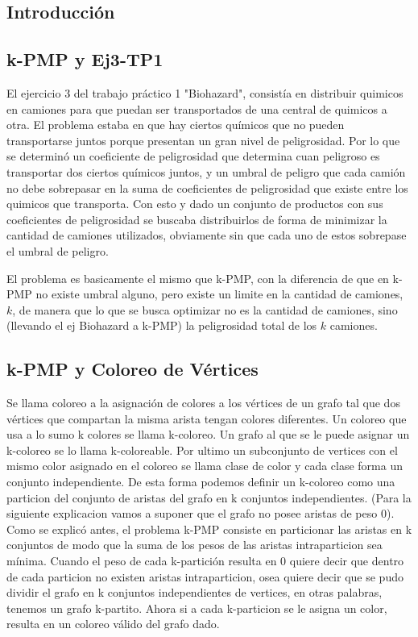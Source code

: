 \subsection{Introducción}


\newpage
\subsection{k-PMP y Ej3-TP1}

El ejercicio 3 del trabajo práctico 1 "Biohazard", consistía en distribuir quimicos en camiones para que puedan ser transportados de una central de quimicos a otra. El problema estaba en que hay ciertos químicos que no pueden transportarse juntos porque presentan un gran nivel de peligrosidad. Por lo que se determinó un coeficiente de peligrosidad que determina cuan peligroso es transportar dos ciertos químicos juntos, y un umbral de peligro que cada camión no debe sobrepasar en la suma de coeficientes de peligrosidad que existe entre los quimicos que transporta.
Con esto y dado un conjunto de productos con sus coeficientes de peligrosidad se buscaba distribuirlos de forma de minimizar la cantidad de camiones utilizados, obviamente sin que cada uno de estos sobrepase el umbral de peligro.

El problema es basicamente el mismo que k-PMP, con la diferencia de que en k-PMP no existe umbral alguno, pero existe un limite en la cantidad de camiones, $k$, de manera que lo que se busca optimizar no es la cantidad de camiones, sino (llevando el ej Biohazard a k-PMP) la peligrosidad total de los $k$ camiones.


\subsection{k-PMP y Coloreo de Vértices}

Se llama coloreo a la asignación de colores a los vértices de un grafo tal que dos vértices que compartan la misma arista tengan colores diferentes. 
Un coloreo que usa a lo sumo k colores se llama k-coloreo. Un grafo al que se le puede asignar un k-coloreo se lo llama k-coloreable. Por ultimo un subconjunto de vertices con el mismo color asignado en el coloreo se llama clase de color y cada clase forma un conjunto independiente. De esta forma podemos definir un k-coloreo como una particion del conjunto de aristas del grafo en k conjuntos independientes.
(Para la siguiente explicacion vamos a suponer que el grafo no posee aristas de peso 0).
Como se explicó antes, el problema k-PMP consiste en particionar las aristas en k conjuntos de modo que la suma de los pesos de las aristas intraparticion sea mínima.
Cuando el peso de cada k-partición resulta en 0 quiere decir que dentro de cada particion no existen aristas intraparticion, osea quiere decir que se pudo dividir el grafo en k conjuntos independientes de vertices, en otras palabras, tenemos un grafo k-partito. Ahora si a cada k-particion se le asigna un color, resulta en un coloreo válido del grafo dado. 


